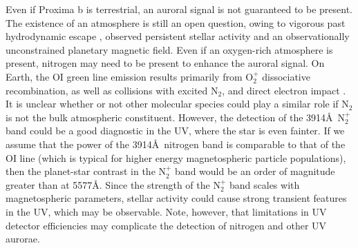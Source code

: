 \documentclass{emulateapj}
\begin{document}
Even if Proxima b is terrestrial, an auroral signal is not guaranteed to be present. The existence of an atmosphere is still an open question, owing to vigorous past hydrodynamic escape \citep{LugerBarnes2015, Barnes2016}, observed persistent stellar activity \citep{Davenport2016} and an observationally unconstrained planetary magnetic field. Even if an oxygen-rich atmosphere is present, nitrogen may need to be present to enhance the auroral signal. On Earth, the OI green line emission results primarily from O$_2^+$ dissociative recombination, as well as collisions with excited N$_2$, and direct electron impact \citep{Strickland2000}. It is unclear whether or not other molecular species could play a similar role if N$_2$ is not the bulk atmospheric constituent. However, the detection of the 3914\AA\ N$_2^+$ band could be a good diagnostic in the UV, where the star is even fainter. If we assume that the power of the 3914\AA\ nitrogen band is comparable to that of the OI line (which is typical for higher energy magnetospheric particle populations), then the planet-star contrast in the N$_2^+$ band would be an order of magnitude greater than at 5577\AA. Since the strength of the N$_2^+$ band scales with magnetospheric parameters, stellar activity could cause strong transient features in the UV, which may be observable. Note, however, that limitations in UV detector efficiencies may complicate the detection of nitrogen and other UV aurorae.
\end{document}
